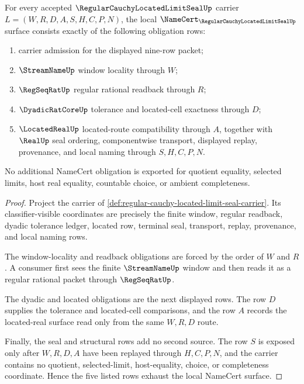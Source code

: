 \begin{theorem}
\label{thm:regular-cauchy-located-limit-seal-obligations}
For every accepted $\RegularCauchyLocatedLimitSealUp$ carrier $L=(W,R,D,A,S,H,C,P,N)$, the local $\NameCert_{\RegularCauchyLocatedLimitSealUp}$ surface consists exactly of the following obligation rows:
\begin{enumerate}
\item carrier admission for the displayed nine-row packet;
\item $\StreamNameUp$ window locality through $W$;
\item $\RegSeqRatUp$ regular rational readback through $R$;
\item $\DyadicRatCoreUp$ tolerance and located-cell exactness through $D$;
\item $\LocatedRealUp$ located-route compatibility through $A$, together with $\RealUp$ seal ordering, componentwise transport, displayed replay, provenance, and local naming through $S,H,C,P,N$.
\end{enumerate}
No additional NameCert obligation is exported for quotient equality, selected limits, host real equality, countable choice, or ambient completeness.
\end{theorem}
\begin{proof}
Project the carrier of \autoref{def:regular-cauchy-located-limit-seal-carrier}. Its classifier-visible coordinates are precisely the finite window, regular readback, dyadic tolerance ledger, located row, terminal seal, transport, replay, provenance, and local naming rows.

The window-locality and readback obligations are forced by the order of $W$ and $R$. A consumer first sees the finite $\StreamNameUp$ window and then reads it as a regular rational packet through $\RegSeqRatUp$.

The dyadic and located obligations are the next displayed rows. The row $D$ supplies the tolerance and located-cell comparisons, and the row $A$ records the located-real surface read only from the same $W,R,D$ route.

Finally, the seal and structural rows add no second source. The row $S$ is exposed only after $W,R,D,A$ have been replayed through $H,C,P,N$, and the carrier contains no quotient, selected-limit, host-equality, choice, or completeness coordinate. Hence the five listed rows exhaust the local NameCert surface.
\end{proof}

